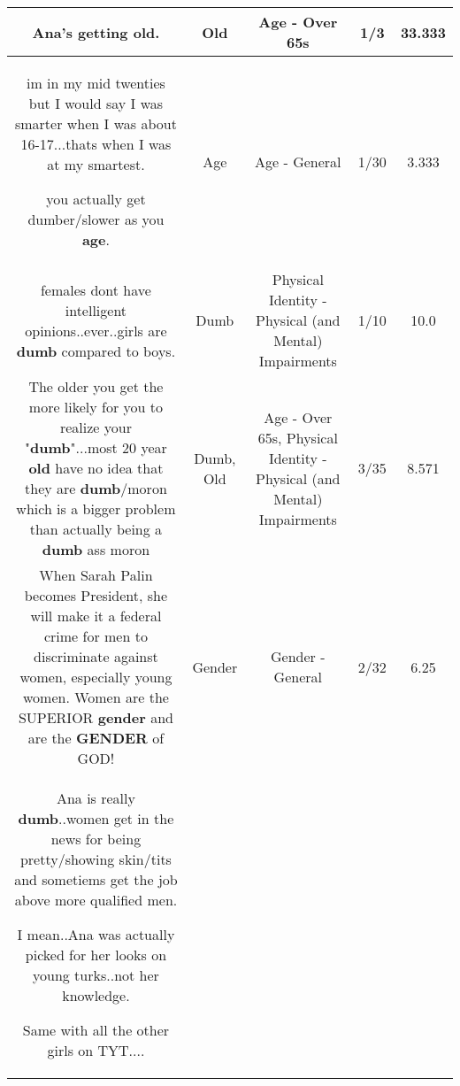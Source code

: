 \documentclass[11pt]{article}
\newlength\mylength
\begin{document}
\begin{center}
\begin{longtable}{|C{.65\mylength}|C{.30\mylength}|C{.12\mylength}|C{.12\mylength}|C{.12\mylength}|}
  \small Ana's getting \textbf{old}.\normalsize   & Old & Age - Over 65s & 1/3 & 33.333 \\  \hline
  \small im in my mid twenties but I would say I was smarter when I was about 16-17...thats when I was at my smartest.

you actually get dumber/slower as you \textbf{age}.\normalsize   & Age & Age - General & 1/30 & 3.333 \\  \hline
  \small females dont have intelligent opinions..ever..girls are \textbf{dumb} compared to boys.\normalsize   & Dumb & Physical Identity - Physical (and Mental) Impairments & 1/10 & 10.0 \\  \hline
  \small The older you get the more likely for you to realize your "\textbf{dumb}"...most 20 year \textbf{old} have no idea that they are \textbf{dumb}/moron which is a bigger problem than actually being a \textbf{dumb} ass moron\normalsize   & Dumb, Old & Age - Over 65s, Physical Identity - Physical (and Mental) Impairments & 3/35 & 8.571 \\  \hline
  \small When Sarah Palin becomes President, she will make it a federal crime for men to discriminate against women, especially young women. Women are the SUPERIOR \textbf{gender} and are the \textbf{GENDER} of GOD!\normalsize   & Gender & Gender - General & 2/32 & 6.25 \\  \hline
  \small Ana is really \textbf{dumb}..women get in the news for being pretty/showing skin/tits and sometiems get the job above more qualified men.

I mean..Ana was actually picked for her looks on young turks..not her knowledge.

Same with all the other girls on TYT....


\end{longtable}
\end{center}
\end{document}
